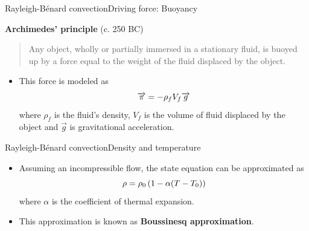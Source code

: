 \documentclass[usenames,dvipsnames,svgnames,10pt,aspectratio=169]{beamer}
\begin{document}
\begin{frame}[t, c]{Rayleigh-Bénard convection}{Driving force: Buoyancy}
	\begin{block}{\centering \textbf{Archimedes' principle} (c. 250 BC)}
		\centering
		\begin{quote}
			Any object, wholly or partially immersed in a stationary fluid, is buoyed up by a force equal to the weight of the fluid displaced by the object.
		\end{quote}
	\end{block}

	\bigskip

	\begin{itemize}
		\item This force is modeled as
		\begin{equation}
			\overrightarrow{\pi} = - \rho_f V_f \overrightarrow{g}
			\notag
		\end{equation}
		where $\rho_f$ is the fluid's density, $V_f$ is the volume of fluid displaced by the object and $\overrightarrow{g}$ is gravitational acceleration.
	\end{itemize}

	\vspace{1cm}
\end{frame}

\begin{frame}[t, c]{Rayleigh-Bénard convection}{Density and temperature}
	\begin{itemize}
		\item Assuming an incompressible flow, the state equation can be approximated as
		\begin{equation}
			\rho = \rho_0 \left( 1 - \alpha (T - T_0) \right)
			\notag
		\end{equation}
		where $\alpha$ is the coefficient of thermal expansion.

		\bigskip

		\item This approximation is known as \alert{\textbf{Boussinesq approximation}}.
	\end{itemize}

	\vspace{1cm}
\end{frame}
\end{document}
